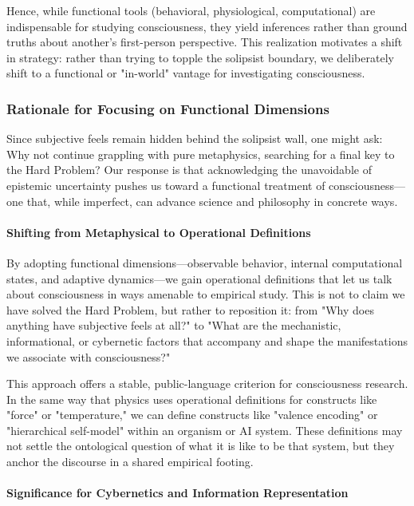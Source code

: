 \documentclass[12pt,letterpaper]{article}
\begin{document}
Hence, while functional tools (behavioral, physiological, computational) are indispensable for studying consciousness, they yield inferences rather than ground truths about another's first-person perspective. This realization motivates a shift in strategy: rather than trying to topple the solipsist boundary, we deliberately shift to a functional or "in-world" vantage for investigating consciousness.

\subsubsection{Rationale for Focusing on Functional Dimensions}

Since subjective feels remain hidden behind the solipsist wall, one might ask: Why not continue grappling with pure metaphysics, searching for a final key to the Hard Problem? Our response is that acknowledging the unavoidable of epistemic uncertainty pushes us toward a functional treatment of consciousness---one that, while imperfect, can advance science and philosophy in concrete ways.

\paragraph{Shifting from Metaphysical to Operational Definitions}

By adopting functional dimensions---observable behavior, internal computational states, and adaptive dynamics---we gain operational definitions that let us talk about consciousness in ways amenable to empirical study. This is not to claim we have solved the Hard Problem, but rather to reposition it: from "Why does anything have subjective feels at all?" to "What are the mechanistic, informational, or cybernetic factors that accompany and shape the manifestations we associate with consciousness?"

This approach offers a stable, public-language criterion for consciousness research. In the same way that physics uses operational definitions for constructs like "force" or "temperature," we can define constructs like "valence encoding" or "hierarchical self-model" within an organism or AI system. These definitions may not settle the ontological question of what it is like to be that system, but they anchor the discourse in a shared empirical footing.

\paragraph{Significance for Cybernetics and Information Representation}
\end{document}
